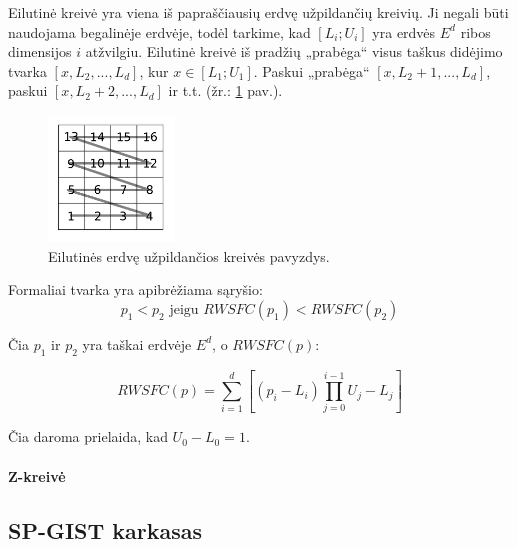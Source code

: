 Eilutinė kreivė yra viena iš papraščiausių erdvę užpildančių kreivių.
Ji negali būti naudojama begalinėje erdvėje, todėl tarkime, kad $[L_i; U_i]$ yra erdvės $E^d$ ribos dimensijos $i$ atžvilgiu.
Eilutinė kreivė iš pradžių „prabėga“ visus taškus didėjimo tvarka $[x, L_2, ..., L_d]$, kur $x \in [L_1; U_1]$.
Paskui „prabėga“ $[x, L_2 + 1, ..., L_d]$, paskui $[x, L_2 + 2, ..., L_d]$ ir t.t. (žr.: \ref{img:RowWiseSpaceFillingCurve} pav.).

\begin{figure}[H]
\begin{center}
\includegraphics[width=0.3\textwidth]{img/RowWiseSpaceFillingCurve.png}
\caption{Eilutinės erdvę užpildančios kreivės pavyzdys.}
\label{img:RowWiseSpaceFillingCurve}
\end{center}
\end{figure}


Formaliai tvarka yra apibrėžiama sąryšio:
\begin{equation}
	p_1 < p_2 \text{ jeigu } RWSFC(p_1) < RWSFC(p_2)
\label{eq:RowWiseSFCComparison}
\end{equation}

Čia $p_1$ ir $p_2$ yra taškai erdvėje $E^d$, o $RWSFC(p)$:

\begin{equation}
	RWSFC(p) = \sum_{i=1}^{d} [(p_i - L_i) \prod_{j=0}^{i - 1}U_j - L_j]
\label{eq:RowWiseSFCValue}
\end{equation}

Čia daroma prielaida, kad $U_0 - L_0 = 1$.



\paragraph{Z-kreivė}




\subsection{SP-GIST karkasas}
